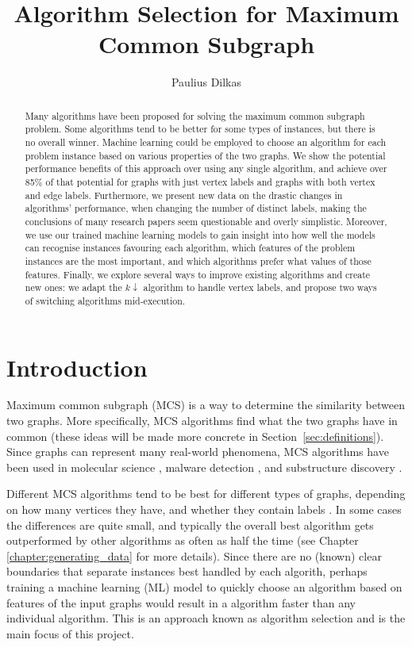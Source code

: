 \documentclass{l4proj}
\title{Algorithm Selection for Maximum Common Subgraph}
\author{Paulius Dilkas}
\theoremstyle{definition}
\theoremstyle{remark}
\begin{document}
\maketitle

\begin{abstract}
  Many algorithms have been proposed for solving the maximum common subgraph
  problem. Some algorithms tend to be better for some types of instances, but
  there is no overall winner. Machine learning could be employed to choose an
  algorithm for each problem instance based on various properties of the two
  graphs. We show the potential performance benefits of this approach over
  using any single algorithm, and achieve over 85\% of that potential for graphs
  with just vertex labels and graphs with both vertex and edge labels.
  Furthermore, we present new data on the drastic changes in algorithms'
  performance, when changing the number of distinct labels, making the
  conclusions of many research papers seem questionable and overly
  simplistic. Moreover, we use our trained machine learning models to gain
  insight into how well the models can recognise instances favouring each
  algorithm, which features of the problem instances are the most important, and
  which algorithms prefer what values of those features. Finally, we explore
  several ways to improve existing algorithms and create new ones: we adapt the
  $k{\downarrow}$ algorithm to handle vertex labels, and propose two ways of
  switching algorithms mid-execution.
\end{abstract}

\educationalconsent
\tableofcontents

\chapter{Introduction}

Maximum common subgraph (MCS) is a way to determine the similarity between two
graphs. More specifically, MCS algorithms find what the two graphs have in
common (these ideas will be made more concrete in
Section~\ref{sec:definitions}). Since graphs can represent many real-world
phenomena, MCS algorithms have been used in molecular science \cite{WCMS:WCMS5,
  DBLP:journals/dam/GayFMSS14, grindley, DBLP:journals/jcamd/RaymondW02a},
malware detection \cite{DBLP:journals/compsec/ParkRS13}, and substructure
discovery \cite{DBLP:journals/jair/CookH94, 617051}.

Different MCS algorithms tend to be best for different types of graphs,
depending on how many vertices they have, and whether they contain labels
\cite{DBLP:conf/ijcai/McCreeshPT17}. In some cases the differences are quite
small, and typically the overall best algorithm gets outperformed by other
algorithms as often as half the time (see Chapter \ref{chapter:generating_data}
for more details). Since there are no (known) clear boundaries that separate
instances best handled by each algorith, perhaps training a machine learning
(ML) model to quickly choose an algorithm based on features of the input graphs
would result in a algorithm faster than any individual algorithm. This is an
approach known as algorithm selection \cite{DBLP:journals/ac/Rice76} and is the
main focus of this project.
\end{document}

